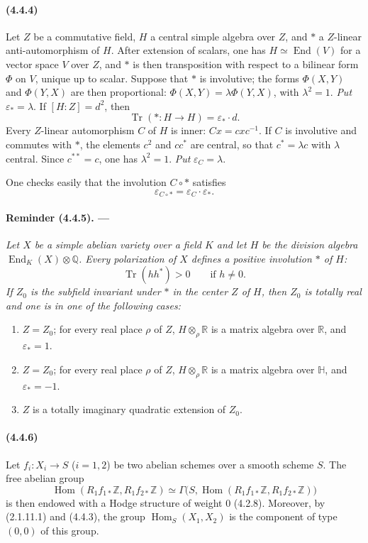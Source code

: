 \documentclass[10pt]{article}
\newcommand{\Q}{\mathbb Q}
\newcommand{\Z}{\mathbb Z}
\newcommand{\Hom}{\operatorname{Hom}}
\newcommand{\R}{\mathbb R}
\providecommand{\End}{\operatorname{End}}
\newcommand{\Tr}{\operatorname{Tr}}
\begin{document}
\paragraph{(4.4.4)} Let $Z$ be a commutative field, $H$ a central simple algebra over $Z$, and $*$ a $Z$-linear anti-automorphism of $H$. After extension of scalars, one has $H\simeq\End(V)$ for a vector space $V$ over $Z$, and $*$ is then transposition with respect to a bilinear form $\Phi$ on $V$, unique up to scalar. Suppose that $*$ is involutive; the forms $\Phi(X,Y)$ and $\Phi(Y,X)$ are then proportional: $\Phi(X,Y)=\lambda\Phi(Y,X)$, with $\lambda^2=1$. \emph{Put} $\varepsilon_*=\lambda$. If $[H:Z]=d^2$, then
\[
\Tr(*:H\to H)=\varepsilon_*\cdot d.
\]
Every $Z$-linear automorphism $C$ of $H$ is inner: $Cx=cxc^{-1}$. If $C$ is involutive and commutes with $*$, the elements $c^2$ and $cc^*$ are central, so that $c^*=\lambda c$ with $\lambda$ central. Since $c^{**}=c$, one has $\lambda^2=1$. \emph{Put} $\varepsilon_C=\lambda$.

One checks easily that the involution $C\circ *$ satisfies
\[
\varepsilon_{C\circ *}=\varepsilon_C\cdot\varepsilon_*.
\]

\paragraph{Reminder (4.4.5). ---} {\itshape Let $X$ be a simple abelian variety over a field $K$ and let $H$ be the division algebra $\End_K(X)\otimes\Q$. Every polarization of $X$ defines a positive involution $*$ of $H$:
\[
\Tr(hh^*)>0\qquad\text{if }h\ne0.
\]
If $Z_0$ is the subfield invariant under $*$ in the center $Z$ of $H$, then $Z_0$ is totally real and one is in one of the following cases:
\begin{enumerate}[label=\alph*)]
\item $Z=Z_0$; for every real place $\rho$ of $Z$, $H\otimes_\rho\R$ is a matrix algebra over $\R$, and $\varepsilon_*=1$.
\item $Z=Z_0$; for every real place $\rho$ of $Z$, $H\otimes_\rho\R$ is a matrix algebra over $\mathbb H$, and $\varepsilon_*=-1$.
\item $Z$ is a totally imaginary quadratic extension of $Z_0$.
\end{enumerate}}

\paragraph{(4.4.6)} Let $f_i:X_i\to S$ ($i=1,2$) be two abelian schemes over a smooth scheme $S$. The free abelian group
\[
\Hom(R_1f_{1*}\Z,R_1f_{2*}\Z)
\simeq\Gamma\bigl(S,\Hom(R_1f_{1*}\Z,R_1f_{2*}\Z)\bigr)
\]
is then endowed with a Hodge structure of weight $0$ (4.2.8). Moreover, by (2.1.11.1) and (4.4.3), the group $\Hom_S(X_1,X_2)$ is the component of type $(0,0)$ of this group.
\end{document}

